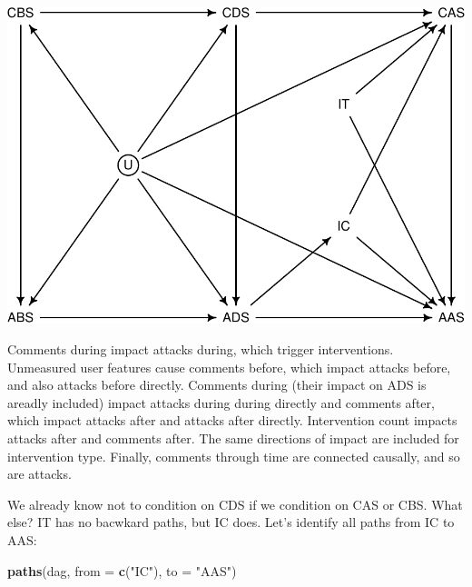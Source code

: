 \documentclass[10pt,dvipsnames,enabledeprecatedfontcommands]{scrartcl}
\newenvironment{Shaded}{\begin{snugshade}}{\end{snugshade}}
\newcommand{\KeywordTok}[1]{\textcolor[rgb]{0.13,0.29,0.53}{\textbf{#1}}}
\newcommand{\DataTypeTok}[1]{\textcolor[rgb]{0.13,0.29,0.53}{#1}}
\newcommand{\StringTok}[1]{\textcolor[rgb]{0.31,0.60,0.02}{#1}}
\newcommand{\NormalTok}[1]{#1}
\begin{document}
\begin{center}\includegraphics[width=0.8\linewidth]{bayesianReport3_files/figure-latex/dag1-1} \end{center}

\normalsize

Comments during impact attacks during, which trigger interventions.
Unmeasured user features cause comments before, which impact attacks
before, and also attacks before directly. Comments during (their impact
on ADS is areadly included) impact attacks during during directly and
comments after, which impact attacks after and attacks after directly.
Intervention count impacts attacks after and comments after. The same
directions of impact are included for intervention type. Finally,
comments through time are connected causally, and so are attacks.

We already know not to condition on CDS if we condition on CAS or CBS.
What else? \textsf{IT} has no bacwkard paths, but \textsf{IC} does.
Let's identify all paths from \textsf{IC} to \textsf{AAS}:

\vspace{1mm} \footnotesize

\begin{Shaded}
\begin{Highlighting}[]
\KeywordTok{paths}\NormalTok{(dag, }\DataTypeTok{from =} \KeywordTok{c}\NormalTok{(}\StringTok{"IC"}\NormalTok{), }\DataTypeTok{to =} \StringTok{"AAS"}\NormalTok{)}
\end{Highlighting}
\end{Shaded}
\end{document}
